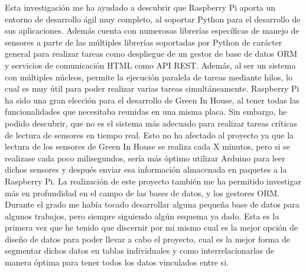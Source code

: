 Esta investigación me ha ayudado a descubrir que Raspberry Pi aporta un entorno de desarrollo ágil muy completo, al soportar Python para el desarrollo de sus aplicaciones. Además cuenta con numerosas librerías específicas de manejo de sensores a parte de las múltiples librerías soportadas por Python de carácter general para realizar tareas como despliegue de un gestor de base de datos ORM y servicios de comunicación HTML como API REST. Además, al ser un sistema con múltiples núcleos, permite la ejecución paralela de tareas mediante hilos, lo cual es muy útil para poder realizar varias tareas simultáneamente. Raspberry Pi ha sido una gran elección para el desarrollo de Green In House, al tener todas las funcionalidades que necesitaba reunidas en una misma placa. Sin embargo, he podido descubrir, que no es el sistema más adecuado para realizar tareas críticas de lectura de sensores en tiempo real. Esto no ha afectado al proyecto ya que la lectura de los sensores de Green In House se realiza cada X minutos, pero si se realizase cada poco milisegundos, sería más óptimo utilizar Arduino para leer dichos sensores y después enviar esa información almacenada en paquetes a la Raspberry Pi.
La realización de este proyecto también me ha permitido investigar más en profundidad en el campo de las bases de datos, y los gestores ORM. Durante el grado me había tocado desarrollar alguna pequeña base de datos para algunos trabajos, pero siempre siguiendo algún esquema ya dado. Esta es la primera vez que he tenido que discernir por mi mismo cual es la mejor opción de diseño de datos para poder llevar a cabo el proyecto, cual es la mejor forma de segmentar dichos datos en tablas individuales y como interrelacionarlas de manera óptima para tener todos los datos vinculados entre si.

